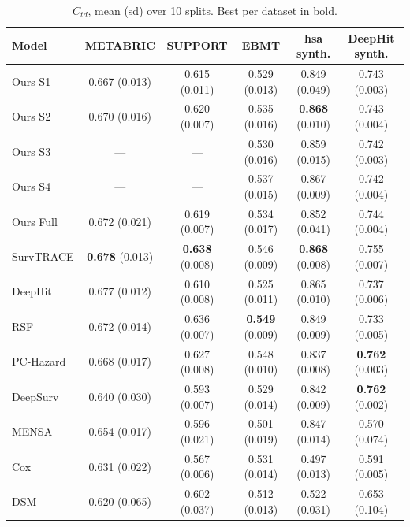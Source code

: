 \documentclass[11pt]{article}
\begin{document}
\begin{table}[H]
\centering
\small
\caption{$C_{td}$, mean (sd) over 10 splits. Best per dataset in bold.}
\begin{tabular}{lccccc}
\toprule
Model & METABRIC & SUPPORT & EBMT & hsa synth. & DeepHit synth. \\
\midrule
Ours S1   & 0.667 (0.013) & 0.615 (0.011) & 0.529 (0.013) & 0.849 (0.049) & 0.743 (0.003) \\
Ours S2   & 0.670 (0.016) & 0.620 (0.007) & 0.535 (0.016) & \textbf{0.868} (0.010) & 0.743 (0.004) \\
Ours S3   & ---           & ---           & 0.530 (0.016) & 0.859 (0.015) & 0.742 (0.003) \\
Ours S4   & ---           & ---           & 0.537 (0.015) & 0.867 (0.009) & 0.742 (0.004) \\
Ours Full & 0.672 (0.021) & 0.619 (0.007) & 0.534 (0.017) & 0.852 (0.041) & 0.744 (0.004) \\
\midrule
SurvTRACE & \textbf{0.678} (0.013) & \textbf{0.638} (0.008) & 0.546 (0.009) & \textbf{0.868} (0.008) & 0.755 (0.007) \\
DeepHit   & 0.677 (0.012) & 0.610 (0.008) & 0.525 (0.011) & 0.865 (0.010) & 0.737 (0.006) \\
RSF       & 0.672 (0.014) & 0.636 (0.007) & \textbf{0.549} (0.009) & 0.849 (0.009) & 0.733 (0.005) \\
PC-Hazard & 0.668 (0.017) & 0.627 (0.008) & 0.548 (0.010) & 0.837 (0.008) & \textbf{0.762} (0.003) \\
DeepSurv  & 0.640 (0.030) & 0.593 (0.007) & 0.529 (0.014) & 0.842 (0.009) & \textbf{0.762} (0.002) \\
MENSA     & 0.654 (0.017) & 0.596 (0.021) & 0.501 (0.019) & 0.847 (0.014) & 0.570 (0.074) \\
Cox       & 0.631 (0.022) & 0.567 (0.006) & 0.531 (0.014) & 0.497 (0.013) & 0.591 (0.005) \\
DSM       & 0.620 (0.065) & 0.602 (0.037) & 0.512 (0.013) & 0.522 (0.031) & 0.653 (0.104) \\
\bottomrule
\end{tabular}
\end{table}
\end{document}
